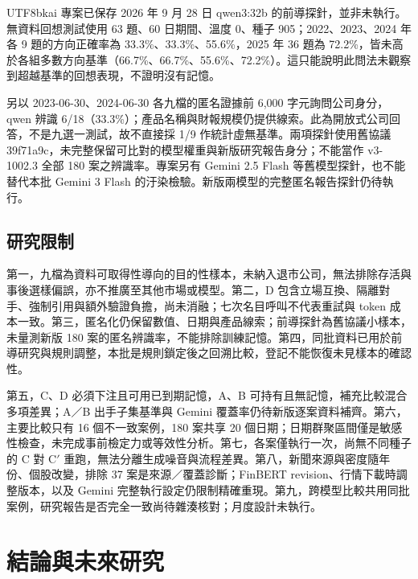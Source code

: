 \documentclass[12pt,a4paper]{article}
\newcommand{\grp}[1]{\textsf{#1}}
\begin{document}
\begin{CJK}{UTF8}{bkai}
專案已保存 2026 年 9 月 28 日 qwen3:32b 的前導探針，並非未執行。無資料回想測試使用 63 題、60 日期間、溫度 0、種子 905；2022、2023、2024 年各 9 題的方向正確率為 33.3\%、33.3\%、55.6\%，2025 年 36 題為 72.2\%，皆未高於各組多數方向基準（66.7\%、66.7\%、55.6\%、72.2\%）。這只能說明此問法未觀察到超越基準的回想表現，不證明沒有記憶。

另以 2023-06-30、2024-06-30 各九檔的匿名證據前 6,000 字元詢問公司身分，qwen 辨識 6/18（33.3\%）；產品名稱與財報規模仍提供線索。此為開放式公司回答，不是九選一測試，故不直接採 1/9 作統計虛無基準。兩項探針使用舊協議 39f71a9c，未完整保留可比對的模型權重與新版研究報告身分；不能當作 v3-1002.3 全部 180 案之辨識率。專案另有 Gemini 2.5 Flash 等舊模型探針，也不能替代本批 Gemini 3 Flash 的汙染檢驗。新版兩模型的完整匿名報告探針仍待執行。

\subsection{研究限制}

第一，九檔為資料可取得性導向的目的性樣本，未納入退市公司，無法排除存活與事後選樣偏誤，亦不推廣至其他市場或模型。第二，\grp{D} 包含立場互換、隔離對手、強制引用與額外驗證負擔，尚未消融；七次名目呼叫不代表重試與 token 成本一致。第三，匿名化仍保留數值、日期與產品線索；前導探針為舊協議小樣本，未量測新版 180 案的匿名辨識率，不能排除訓練記憶。第四，同批資料已用於前導研究與規則調整，本批是規則鎖定後之回溯比較，登記不能恢復未見樣本的確認性。

第五，\grp{C}、\grp{D} 必須下注且可用已到期記憶，\grp{A}、\grp{B} 可持有且無記憶，補充比較混合多項差異；A／B 出手子集基準與 Gemini 覆蓋率仍待新版逐案資料補齊。第六，主要比較只有 16 個不一致案例，180 案共享 20 個日期；日期群聚區間僅是敏感性檢查，未完成事前檢定力或等效性分析。第七，各案僅執行一次，尚無不同種子的 C 對 C$'$ 重跑，無法分離生成噪音與流程差異。第八，新聞來源與密度隨年份、個股改變，排除 37 案是來源／覆蓋診斷；FinBERT revision、行情下載時調整版本，以及 Gemini 完整執行設定仍限制精確重現。第九，跨模型比較共用同批案例，研究報告是否完全一致尚待雜湊核對；月度設計未執行。



\section{結論與未來研究}
\label{sec:conclusion}


\end{CJK}
\end{document}
